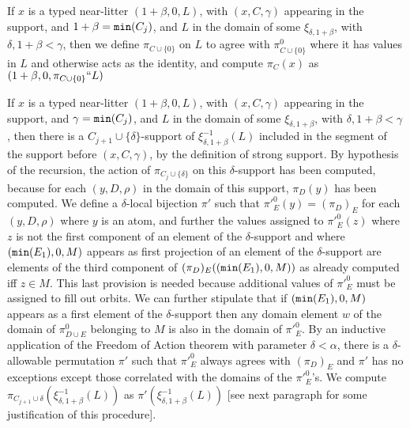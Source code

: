 \documentclass[12pt]{article}
\begin{document}
If $x$ is a typed near-litter $(1+\beta,0,L)$, with $(x,C,\gamma)$ appearing in the support, and $1+\beta={\tt min}(C_j)$, and $L$ in the domain of some $\xi_{\delta,1+\beta}$, with  $\delta,1+\beta<\gamma$, then we define $\pi_{C \cup \{0\}}$ on $L$  to agree with $\pi^0_{C \cup\{0\}}$ where it has values in $L$ and otherwise acts as the identity,
and compute $\pi_C(x)$ as $(1+\beta,0,\pi_{C \cup \{0\}}``L)$

If $x$ is a typed near-litter $(1+\beta,0,L)$, with $(x,C,\gamma)$ appearing in the support, and $\gamma={\tt min}(C_j)$, and $L$ in the domain of some $\xi_{\delta,1+\beta}$, with  $\delta,1+\beta<\gamma$, then there is a $C_{j+1}\cup \{\delta\}$-support of $\xi_{\delta,1+\beta}^{-1}(L)$ included in the segment of the support before $(x,C,\gamma)$, by the definition of strong support.   By hypothesis of the recursion, the action of $\pi_{C_j \cup \{\delta\}}$ on this $\delta$-support has been computed, because for each $(y,D,\rho)$ in the domain of this support, $\pi_D(y)$ has been computed.  We define a $\delta$-local bijection $\pi'$ such that $\pi'^0_E(y) = (\pi_D)_E$ for each $(y,D,\rho)$ where $y$ is an atom, and further
the values assigned to $\pi'^0_E (z)$ where $z$ is not the first component of an element of the $\delta$-support and where $({\tt min}(E_1),0,M)$ appears as first projection of an element of the $\delta$-support are elements of the third component of $(\pi_D)_E(({\tt min}(E_1),0,M))$ as already computed iff $z \in M$.  This last provision is needed because additional values of  $\pi'^0_E$ must be assigned to fill out orbits.  We can further stipulate that if $({\tt min}(E_1),0,M)$ appears as a first element of the $\delta$-support then any domain element $w$ of the domain of $\pi^0_{D \cup E}$ belonging to $M$ is also in the domain of $\pi'^0_E$.  By an inductive application of the Freedom of Action theorem with parameter $\delta<\alpha$, there is a $\delta$-allowable permutation $\pi'$ such that $\pi'^0_E$ always agrees with $(\pi_D)_E$ and $\pi'$ has no exceptions except those correlated with the domains of the $\pi'^0_E$'s.  We compute $\pi_{C_{j+1}\cup \delta}(\xi_{\delta,1+\beta}^{-1}(L))$ as $\pi'(\xi_{\delta,1+\beta}^{-1}(L))$ [see next paragraph for some justification of this procedure].
\end{document}
